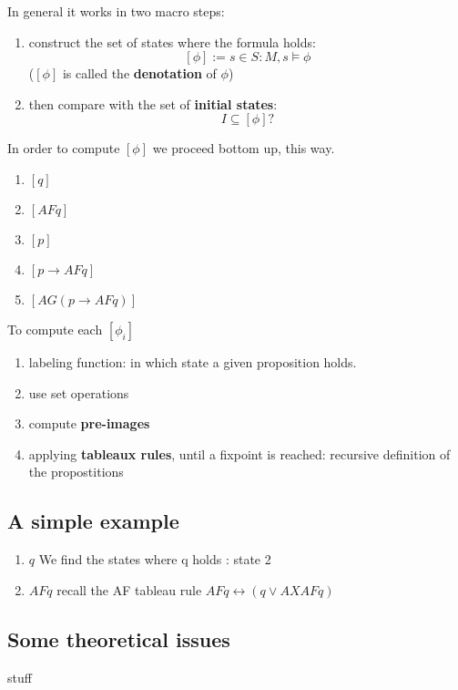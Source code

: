 \documentclass[11pt]{article}
\begin{document}
In general it works in two macro steps:
\begin{enumerate}
	\item construct the set of states where the formula holds:\[
		[\phi] := {s \in S : M,s \models \phi}
	\] ($[\phi]$ is called the \textbf{denotation} of $\phi$)

	\item then compare with the set of \textbf{initial states}:\[
		I \subseteq [\phi] ?
	\]
\end{enumerate}
In order to compute $[\phi]$ we proceed bottom up, this way. 
\begin{enumerate}
	\item $[q]$
	\item $[AFq]$
	\item $[p]$
	\item $[p \rightarrow AFq]$
	\item $[AG (p \rightarrow AFq)]$
\end{enumerate}
To compute each $[\phi _i]$
\begin{enumerate}
	\item labeling function: in which state a given proposition holds.
	\item use set operations
	\item compute \textbf{pre-images}
	\item applying \textbf{tableaux rules}, until a fixpoint is reached: recursive definition of the propostitions
\end{enumerate}

\subsection{A simple example} %
\label{sub:a_simple_example}
\begin{enumerate}
	\item $q$ We find the states where q holds : state 2
	\item $AF q$ recall the AF tableau rule $AF q \leftrightarrow (q \lor AXAF q)$
\end{enumerate}
\subsection{Some theoretical issues} %
\label{sub:some_theoretical_issues}
stuff


\end{document}
